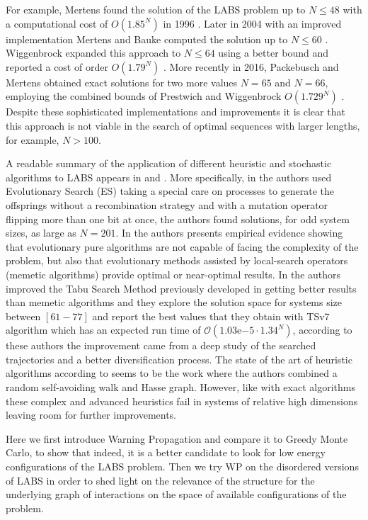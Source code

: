 \documentclass[11pt]{amsart}
\theoremstyle{definition} \newtheorem{defi}{Definition}
\begin{document}
For example, Mertens found the solution of the LABS problem up to $N \leq 48$ with a computational cost of $O(1.85^N)$ in 1996 \cite{Mertens96}.
Later in 2004 with an improved implementation Mertens and Bauke computed the solution up to $N \leq 60$ \cite{Mertens16}. 
Wiggenbrock expanded this approach to $N \leq 64$ using a better bound and reported a cost of order $O(1.79^N)$ \cite{Mertens16}.
More recently in 2016, Packebusch and Mertens obtained exact solutions for two more values $N = 65$ and $N = 66$, employing the combined bounds of Prestwich and Wiggenbrock $O(1.729^N)$ \cite{Mertens16}.
Despite these sophisticated implementations and improvements it is clear that this approach is not viable in the search of optimal sequences with larger lengths, for example, $N > 100$.

A readable summary of the application of different heuristic and stochastic algorithms to LABS appears in  \cite{Amaya13} and \cite{bovskovic14}.
More specifically, in \cite{Militzer} the authors used  Evolutionary Search (ES) taking a special care on processes to generate the offsprings without a recombination strategy and with a mutation operator flipping more than one bit at once, the authors found solutions, for odd system sizes, as large as $N = 201$.
In \cite{Gallardo} the authors presents empirical evidence showing that evolutionary pure algorithms are not capable of facing the complexity of the problem, but also that evolutionary methods assisted by local-search operators (memetic algorithms) provide optimal or near-optimal results.
In \cite{Halim} the authors improved the Tabu Search Method previously developed in \cite{Dotu} getting better results than memetic algorithms and they explore the solution space for systems size between $[61-77]$ and report the best values that they obtain with TSv7 algorithm which has an expected run time of $\mathcal{O}( 1.03\mathrm{e}{-5} \cdot 1.34^N)$,  according to these authors the improvement came from a deep study of the searched trajectories and a better diversification process.
The state of the art of heuristic algorithms according to \cite{Mertens16} seems to be the work \cite{bovskovic14} where the authors combined a random self-avoiding walk and Hasse graph.
However, like with exact algorithms these complex and advanced heuristics fail in systems of relative high dimensions \cite{Mertens16} leaving room for further improvements.

Here we first introduce Warning Propagation and compare it to Greedy Monte Carlo, to show that indeed, it is a better candidate to look for low energy configurations of the LABS problem. 
Then we try WP on the disordered versions of LABS in order to shed light on the relevance of the structure for the underlying graph of interactions on the space of available configurations of the problem.
\end{document}

